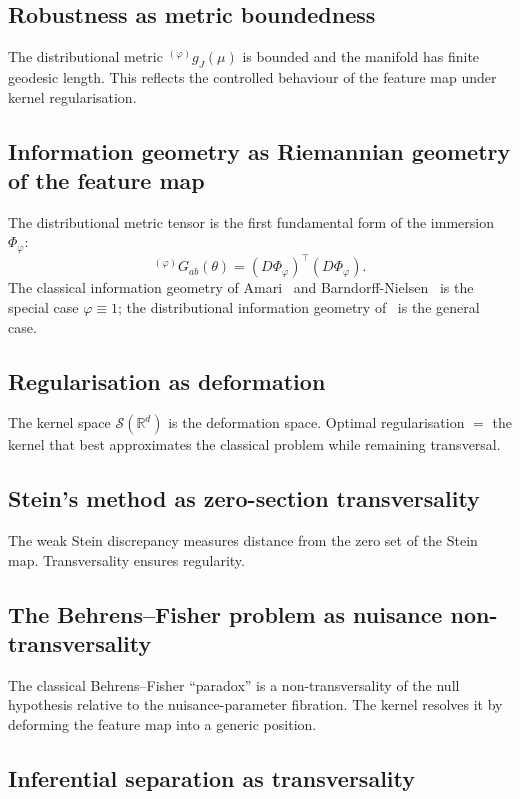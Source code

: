 \documentclass[11pt,a4paper]{article}
\newcommand{\R}{\mathbb{R}}
\newcommand{\cS}{\mathcal{S}}
\newcommand{\wg}{{}^{(\varphi)}\!g}
\newcommand{\wG}{{}^{(\varphi)}\!G}
\begin{document}
\subsection{Robustness as metric boundedness}

The distributional metric $\wg_J(\mu)$ is bounded and the manifold
has finite geodesic length.  This reflects the controlled behaviour
of the feature map under kernel regularisation.

\subsection{Information geometry as Riemannian geometry of the
  feature map}
\label{sec:info_geom}

The distributional metric tensor is the first fundamental form of the
immersion $\Phi_\varphi$:
\[
  \wG_{ab}(\theta)
  = (D\Phi_\varphi)^\top(D\Phi_\varphi).
\]
The classical information geometry of
Amari~\cite{Amari1985} and
Barndorff-Nielsen~\cite{BarndorffNielsen1978} is the special case
$\varphi\equiv 1$; the distributional information geometry
of~\cite{C} is the general case.

\subsection{Regularisation as deformation}

The kernel space $\cS(\R^d)$ is the deformation space.  Optimal
regularisation $=$ the kernel that best approximates the classical
problem while remaining transversal.

\subsection{Stein's method as zero-section transversality}

The weak Stein discrepancy measures distance from the zero set of the
Stein map.  Transversality ensures regularity.

\subsection{The Behrens--Fisher problem as nuisance non-transversality}

The classical Behrens--Fisher ``paradox'' is a non-transversality of
the null hypothesis relative to the nuisance-parameter fibration.
The kernel resolves it by deforming the feature map into a generic
position.

\subsection{Inferential separation as transversality}
\label{sec:inferential_separation}
\end{document}
